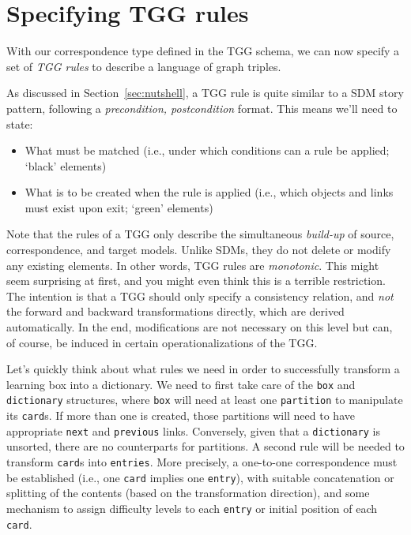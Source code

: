 \newpage
\hypertarget{sec:Rules}{}
\section{Specifying TGG rules}
\genHeader

With our correspondence type defined in the TGG schema, we can now specify a set of \emph{TGG rules} to describe a language of graph
triples.

As discussed in Section~\ref{sec:nutshell}, a TGG rule is quite similar to a SDM story pattern, following a \emph{precondition, postcondition}
format. This means we'll need to state:

\begin{itemize}

\item What must be matched (i.e., under which conditions can a rule be applied; `black' elements)

\item What is to be created when the rule is applied (i.e., which objects and links must exist upon exit; `green' elements)

\end{itemize}

\vspace{0.5cm}

Note that the rules of a TGG only describe the simultaneous \emph{build-up} of source, correspondence, and target models.
Unlike SDMs, they do not delete or modify any existing elements. 
In other words, TGG rules are \emph{monotonic}.
This might seem surprising at first, and you might even think
this is a terrible restriction. 
The intention is that a TGG should only specify a consistency relation, and \emph{not} the forward and backward transformations
directly, which are derived automatically. 
In the end, modifications are not necessary on this level but can, of course, be induced in certain
operationalizations of the TGG.

Let's quickly think about what rules we need in order to successfully transform a learning box into a dictionary. 
We need to first take care of the \texttt{box}
and \texttt{dictionary} structures, where \texttt{box} will need at least one \texttt{partition} to manipulate its \texttt{card}s. If more than one is created, those partitions will need to have appropriate \texttt{next} and \texttt{previous} links. 
Conversely, given that a \texttt{dictionary} is unsorted, there are no
counterparts for partitions. 
A second rule will be needed to transform \texttt{card}s into \texttt{entries}.
More precisely, a one-to-one correspondence must be
established (i.e., one \texttt{card} implies one \texttt{entry}), with suitable
concatenation or splitting of the contents (based on the transformation direction), and some mechanism to assign difficulty levels to each \texttt{entry} or initial position of each \texttt{card}.







